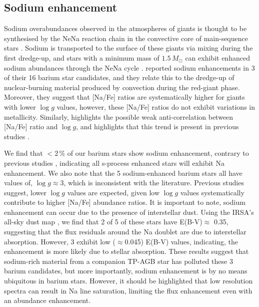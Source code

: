 \documentclass[a4paper,fleqn,usenatbib]{mnras}
\begin{document}
\subsection{Sodium enhancement}
Sodium overabundances observed in the atmospheres of giants is thought to be synthesised by the NeNa reaction chain in the convective core of main-sequence stars \citep{el1995}. Sodium is transported to the surface of these giants via mixing during the first dredge-up, and stars with a  minimum mass of $1.5\,M_\odot$ can exhibit enhanced sodium abundances through the NeNa cycle \citep{denissenkov1987,smiljanic2012}. \citet{antipova2004} reported sodium enhancements in 3 of their 16 barium star candidates, and they relate this to the dredge-up of nuclear-burning material produced by convection during the red-giant phase. Moreover, they suggest that [Na/Fe] ratios are systematically higher for giants with lower $\log{g}$ values, however, these [Na/Fe] ratios do not exhibit variations in metallicity. Similarly, \citet{decastro2016} highlights the possible weak anti-correlation between [Na/Fe] ratio and $\log{g}$, and highlights that this trend is present in previous studies \citep[e.g.,][]{boyarchuk2002,mishenina2006,luck2007,takeda2008}.

We find that $<2$\,\% of our barium stars show sodium enhancement, contrary to previous studies \citep[e.g.,][]{decastro2016}, indicating all s-process enhanced stars will exhibit Na enhancement. We also note that the 5 sodium-enhanced barium stars all have values of, $\log{g} \approx 3$, which is inconsistent with the literature. Previous studies suggest, lower $\log{g}$ values are expected, given low $\log{g}$ values systematically contribute to higher [Na/Fe] abundance ratios. It is important to note, sodium enhancement can occur due to the presence of interstellar dust. Using the IRSA's all-sky dust map \citep{schlafly2011}, we find that 2 of 5 of these stars have E(B-V)$\approx$ 0.35, suggesting that the flux residuals around the Na doublet are due to interstellar absorption. However, 3 exhibit low ($\approx$0.045) E(B-V) values, indicating, the enhancement is more likely due to stellar absorption. These results suggest that sodium-rich material from a companion TP-AGB star has polluted these 3 barium candidates, but more importantly, sodium enhancement is by no means ubiquitous in barium stars. However, it should be highlighted that low resolution spectra can result in Na line saturation, limiting the flux enhancement even with an abundance enhancement.
\end{document}
